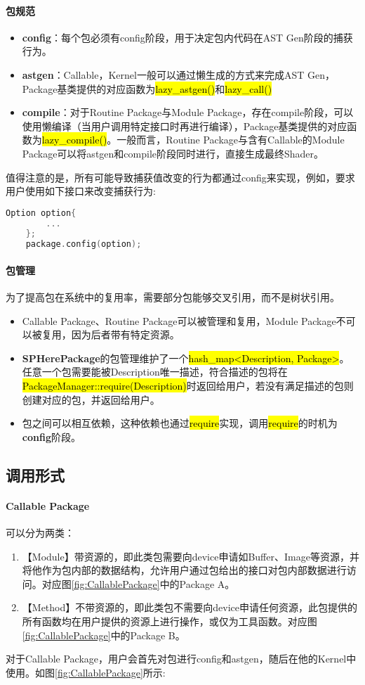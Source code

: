 \paragraph{包规范}
\begin{itemize}
	\item \textbf{config}：每个包必须有config阶段，用于决定包内代码在AST Gen阶段的捕获行为。
	\item \textbf{astgen}：Callable，Kernel一般可以通过懒生成的方式来完成AST Gen，Package基类提供的对应函数为\hl{lazy\_astgen()}和\hl{lazy\_call()}
	      \item\textbf{ compile}：对于Routine Package与Module Package，存在compile阶段，可以使用懒编译（当用户调用特定接口时再进行编译），Package基类提供的对应函数为\hl{lazy\_compile()}。一般而言，Routine Package与含有Callable的Module Package可以将astgen和compile阶段同时进行，直接生成最终Shader。
\end{itemize}
值得注意的是，所有可能导致捕获值改变的行为都通过config来实现，例如，要求用户使用如下接口来改变捕获行为:
\begin{lstlisting}[language=C++]
	Option option{
		...
	};
	package.config(option);
\end{lstlisting}
\paragraph{包管理}
为了提高包在系统中的复用率，需要部分包能够交叉引用，而不是树状引用。
\begin{itemize}
	\item Callable Package、Routine Package可以被管理和复用，Module Package不可以被复用，因为后者带有特定资源。
	\item \textbf{SPHerePackage}的包管理维护了一个\hl{hash\_map\textless Description, Package\textgreater}。 任意一个包需要能被Description唯一描述，符合描述的包将在\hl{PackageManager::require(Description)}时返回给用户，若没有满足描述的包则创建对应的包，并返回给用户。
	\item 包之间可以相互依赖，这种依赖也通过\hl{require}实现，调用\hl{require}的时机为\textbf{config}阶段。
\end{itemize}

\subsection{调用形式}
\paragraph{Callable Package}可以分为两类：
\begin{enumerate}
	\item 【Module】带资源的，即此类包需要向device申请如Buffer、Image等资源，并将他作为包内部的数据结构，允许用户通过包给出的接口对包内部数据进行访问。对应图\ref{fig:CallablePackage}中的Package A。
	\item 【Method】不带资源的，即此类包不需要向device申请任何资源，此包提供的所有函数均在用户提供的资源上进行操作，或仅为工具函数。对应图\ref{fig:CallablePackage}中的Package B。
\end{enumerate}
对于Callable Package，用户会首先对包进行config和astgen，随后在他的Kernel中使用。如图\ref{fig:CallablePackage}所示:

